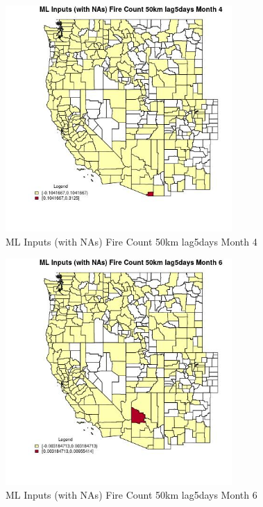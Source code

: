 \begin{figure} 
\centering  
\includegraphics[width=0.77\textwidth]{Code_Outputs/Report_ML_input_PM25_Step4_part_e_de_duplicated_aves_compiled_2019-05-20wNAs_CountyFire_Count_50km_lag5daysmedianMonth4.jpg} 
\caption{\label{fig:Report_ML_input_PM25_Step4_part_e_de_duplicated_aves_compiled_2019-05-20wNAsCountyFire_Count_50km_lag5daysmedianMonth4}ML Inputs (with NAs) Fire Count 50km lag5days Month 4} 
\end{figure} 
 

\begin{figure} 
\centering  
\includegraphics[width=0.77\textwidth]{Code_Outputs/Report_ML_input_PM25_Step4_part_e_de_duplicated_aves_compiled_2019-05-20wNAs_CountyFire_Count_50km_lag5daysmedianMonth6.jpg} 
\caption{\label{fig:Report_ML_input_PM25_Step4_part_e_de_duplicated_aves_compiled_2019-05-20wNAsCountyFire_Count_50km_lag5daysmedianMonth6}ML Inputs (with NAs) Fire Count 50km lag5days Month 6} 
\end{figure} 
 

